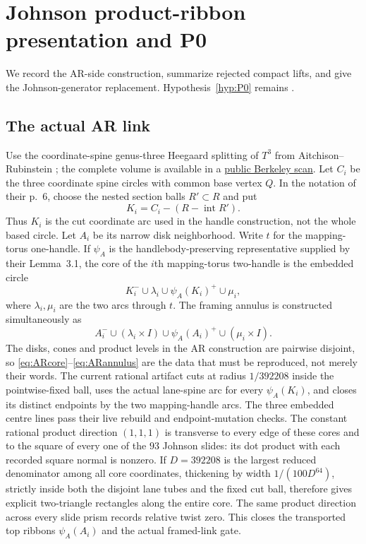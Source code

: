 \section{Johnson product-ribbon presentation and P0}\label{sec:johnson-presentation}

We record the AR-side construction, summarize rejected compact lifts, and
give the Johnson-generator replacement.  Hypothesis~\ref{hyp:P0} remains
\Open.

\subsection{The actual AR link}

Use the coordinate-spine genus-three Heegaard splitting of $T^3$ from
Aitchison--Rubinstein \cite[pp.~5--12]{AitchisonRubinstein1984}; the complete
volume is available in a
\href{https://math.berkeley.edu/~kirby/papers/Gordon%20and%20Kirby%20%28editors%29%20-%20Four-manifold%20theory%20%28Durham%29%20-%20MR0780574.pdf}
{public Berkeley scan}.  Let $C_i$ be the three coordinate spine circles with
common base vertex $Q$.  In the notation of their p.~6, choose the nested
section balls $R'\subset R$ and put
\[
K_i=C_i-(R-\operatorname{int}R').
\]
Thus $K_i$ is the cut coordinate arc used in the handle construction, not the
whole based circle.  Let $A_i$ be its narrow disk neighborhood.
Write $t$ for the mapping-torus one-handle.  If $\psi_A$ is the
handlebody-preserving representative supplied by their Lemma~3.1, the core
of the $i$th mapping-torus two-handle is the embedded circle
\begin{equation}\label{eq:ARcore}
K_i^-\cup\lambda_i\cup\psi_A(K_i)^+\cup\mu_i,
\end{equation}
where $\lambda_i,\mu_i$ are the two arcs through $t$.  The framing annulus is
constructed simultaneously as
\begin{equation}\label{eq:ARannulus}
A_i^-\cup(\lambda_i\times I)\cup\psi_A(A_i)^+
       \cup(\mu_i\times I).
\end{equation}
The disks, cones and product levels in the AR construction are pairwise
disjoint, so \eqref{eq:ARcore}--\eqref{eq:ARannulus} are the data that must be
reproduced, not merely their words.  The current rational artifact cuts at
radius $1/392208$ inside the pointwise-fixed ball, uses the actual lane-spine
arc for every $\psi_A(K_i)$, and closes its distinct endpoints by the two
mapping-handle arcs.  The three embedded centre lines pass their live rebuild
and endpoint-mutation checks.  The constant rational product direction
$(1,1,1)$ is transverse to every edge of these cores and to the square of
every one of the $93$ Johnson slides: its dot product with each recorded
square normal is nonzero.  If $D=392208$ is the largest reduced denominator
among all core coordinates, thickening by width $1/(100D^{64})$, strictly
inside both the disjoint lane tubes and the fixed cut ball, therefore gives
explicit two-triangle rectangles along the entire core.  The same product
direction across every slide prism records relative twist zero.  This closes
the transported top ribbons $\psi_A(A_i)$ and the actual framed-link gate.

